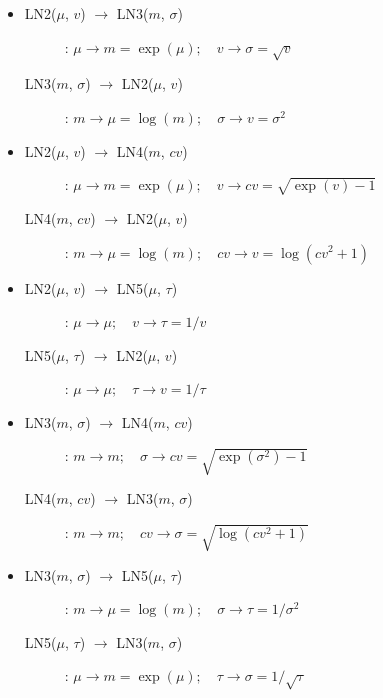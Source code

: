 {\begin{itemize}
\item 
\begin{description}
\item[LN2($\mu$, $v$) $\rightarrow$ LN3($m$, $\sigma$)]:
$\mu \rightarrow m=\exp(\mu); \quad v \rightarrow \sigma=\sqrt{v}$

\item[LN3($m$, $\sigma$) $\rightarrow$ LN2($\mu$, $v$)]:
$m \rightarrow \mu=\log(m); \quad \sigma \rightarrow v=\sigma^2$
\end{description}

\item 
\begin{description}
\item[LN2($\mu$, $v$) $\rightarrow$ LN4($m$, $cv$)]:
$\mu \rightarrow m=\exp(\mu); \quad v \rightarrow cv=\sqrt{\exp(v) -1}$

\item[LN4($m$, $cv$) $\rightarrow$ LN2($\mu$, $v$)]:
$m \rightarrow \mu=\log(m); \quad cv \rightarrow v=\log(cv^2+1)$
\end{description}

\item 
\begin{description}
\item[LN2($\mu$, $v$) $\rightarrow$ LN5($\mu$, $\tau$)]:
$\mu \rightarrow \mu; \quad v \rightarrow \tau=1/v$

\item[LN5($\mu$, $\tau$) $\rightarrow$ LN2($\mu$, $v$)]:
$\mu \rightarrow \mu; \quad \tau \rightarrow v=1/\tau$
\end{description}

\item 
\begin{description}
\item[LN3($m$, $\sigma$) $\rightarrow$ LN4($m$, $cv$)]:
$m \rightarrow m; \quad \sigma \rightarrow cv=\sqrt{\exp(\sigma^2)-1}$

\item[LN4($m$, $cv$) $\rightarrow$ LN3($m$, $\sigma$)]:
$m \rightarrow m; \quad cv \rightarrow \sigma=\sqrt{\log(cv^2 + 1)}$
\end{description}

\item 
\begin{description}
\item[LN3($m$, $\sigma$) $\rightarrow$ LN5($\mu$, $\tau$)]:
$m \rightarrow \mu=\log(m); \quad \sigma \rightarrow \tau=1/\sigma^2$

\item[LN5($\mu$, $\tau$) $\rightarrow$ LN3($m$, $\sigma$)]:
$\mu \rightarrow m=\exp(\mu); \quad \tau \rightarrow \sigma=1/\sqrt{\tau}$
\end{description}


\end{itemize}}
